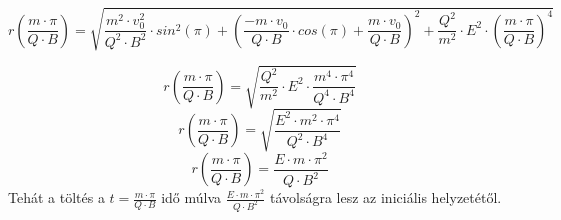 \documentclass[11pt,a4paper,openany,leqno]{article}
\begin{document}
$$ r(\frac{m \cdot \pi}{Q \cdot B}) = \sqrt{\frac{m^2\cdot v_0^2}{Q^2\cdot B^2}\cdot sin^2(\pi) + (\frac{- m\cdot v_0}{Q\cdot B} \cdot cos(\pi) + \frac{m\cdot v_0}{Q\cdot B})^2 + \frac{Q^2}{m^2}\cdot E^2 \cdot (\frac{m \cdot \pi}{Q \cdot B})^4} $$

$$ r(\frac{m \cdot \pi}{Q \cdot B}) = \sqrt{\frac{Q^2}{m^2}\cdot E^2 \cdot \frac{m^4 \cdot \pi^4}{Q^4 \cdot B^4}} $$
$$ r(\frac{m \cdot \pi}{Q \cdot B}) = \sqrt{\frac{E^2 \cdot m^2 \cdot \pi^4}{Q^2 \cdot B^4}} $$
$$ r(\frac{m \cdot \pi}{Q \cdot B}) = \frac{E \cdot m \cdot \pi^2}{Q \cdot B^2} $$
 Tehát a töltés a $t=\frac{m \cdot \pi}{Q \cdot B}$ idő múlva $\frac{E \cdot m \cdot \pi^2}{Q \cdot B^2}$ távolságra lesz az iniciális helyzetétől.
\end{document}

